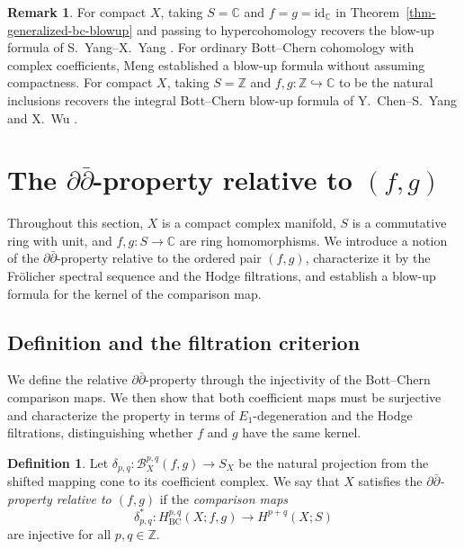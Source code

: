 \documentclass[11pt]{amsart}
\numberwithin{equation}{section}
\theoremstyle{plain}
\theoremstyle{definition}
\newtheorem{De}[thm]{Definition}
\newtheorem{Rem}[thm]{Remark}
\begin{document}
\begin{Rem}
For compact $X$, taking $S=\mathbb C$ and $f=g=\mathrm{id}_{\mathbb C}$
in Theorem~\ref{thm-generalized-bc-blowup} and passing to hypercohomology
recovers the blow-up formula of S.~Yang--X.~Yang \cite[Theorem 3.7]{SY}.
For ordinary Bott--Chern cohomology with complex coefficients, Meng
\cite[Proposition 4.15]{Mn20BC} established a blow-up formula without
assuming compactness.
For compact $X$, taking $S=\mathbb Z$ and
$f,g:\mathbb Z\hookrightarrow\mathbb C$ to be the natural inclusions
recovers the integral Bott--Chern blow-up
formula of Y.~Chen--S.~Yang \cite[Theorem 1.2]{CSY} and X.~Wu
\cite[Proposition 12]{Wu}.
\end{Rem}

\section{\texorpdfstring{The $\partial\bar\partial$-property relative to $(f,g)$}{The d-dbar-property relative to (f,g)}}
\label{sec-generalized-ddbar}

Throughout this section, $X$ is a compact complex manifold,
$S$ is a commutative ring with unit, and $f,g:S\longrightarrow\mathbb C$
are ring homomorphisms. We introduce a notion of the $\partial\bar\partial$-property
relative to the ordered pair $(f,g)$, characterize it by the Fr\"olicher
spectral sequence and the Hodge filtrations, and establish a blow-up
formula for the kernel of the comparison map.

\subsection{Definition and the filtration criterion}

We define the relative $\partial\bar\partial$-property through the
injectivity of the Bott--Chern comparison maps. We then show that both
coefficient maps must be surjective and characterize the property in
terms of $E_1$-degeneration and the Hodge filtrations, distinguishing
whether $f$ and $g$ have the same kernel.

\begin{De}\label{def-relative-ddbar}
Let $\delta_{p,q}:\mathcal B_X^{p,q}(f,g)\longrightarrow S_X$ be the
natural projection from the shifted mapping cone to its coefficient
complex. We say that $X$ satisfies the \emph{$\partial\bar\partial$-property
relative to $(f,g)$} if the \emph{comparison maps}
\[
\delta_{p,q}^*:H^{p,q}_{\mathrm{BC}}(X;f,g)
\longrightarrow H^{p+q}(X;S)
\]
are injective for all $p,q\in\mathbb Z$.
\end{De}
\end{document}
